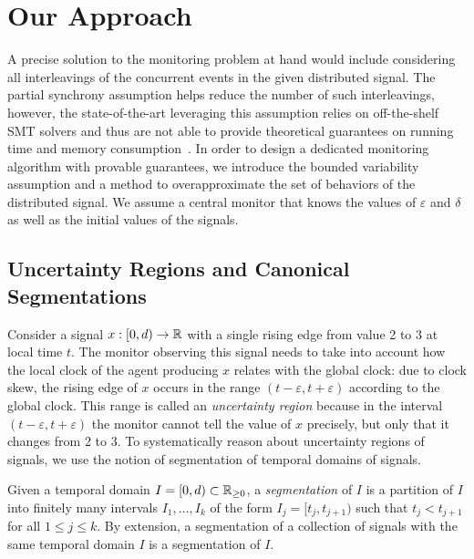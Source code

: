 \section{Our Approach}

A precise solution to the monitoring problem at hand would include considering all interleavings of the concurrent events in the given distributed signal.
The partial synchrony assumption helps reduce the number of such interleavings, however, the state-of-the-art leveraging this assumption relies on off-the-shelf SMT solvers and thus are not able to provide theoretical guarantees on running time and memory consumption~\cite{GangulyMB20,MomtazAB23}.
In order to design a dedicated monitoring algorithm with provable guarantees, we introduce the bounded variability assumption and a method to overapproximate the set of behaviors of the distributed signal.
We assume a central monitor that knows the values of $\varepsilon$ and $\delta$ as well as the initial values of the signals.


\subsection{Uncertainty Regions and Canonical Segmentations} \label{sec:segment}

Consider a signal $x : [0,d) \to \mathbb{R}$ with a single rising edge from value 2 to 3 at local time $t$.
The monitor observing this signal needs to take into account how the local clock of the agent producing $x$ relates with the global clock: due to clock skew, the rising edge of $x$ occurs in the range $(t - \varepsilon, t + \varepsilon)$ according to the global clock.
This range is called an \emph{uncertainty region} because in the interval $(t - \varepsilon, t + \varepsilon)$ the monitor cannot tell the value of $x$ precisely, but only that it changes from 2 to 3.
To systematically reason about uncertainty regions of signals, we use the notion of segmentation of temporal domains of signals.

Given a temporal domain $I = [0,d) \subset \mathbb{R}_{\geq 0}$, a \emph{segmentation} of $I$ is a partition of $I$ into finitely many intervals $I_1, \ldots, I_k$ of the form $I_j = [t_j, t_{j+1})$ such that $t_j < t_{j+1}$ for all $1 \leq j \leq k$.
By extension, a segmentation of a collection of signals with the same temporal domain $I$ is a segmentation of $I$.

